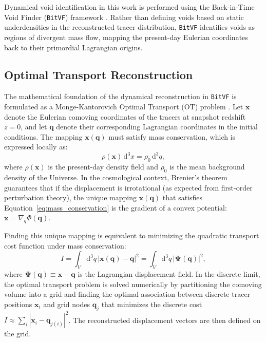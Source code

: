 \documentclass[12pt]{report}
\begin{document}
Dynamical void identification in this work is performed using the Back-in-Time Void Finder (\texttt{BitVF}) framework \citep{Sartori2025}. Rather than defining voids based on static underdensities in the reconstructed tracer distribution, \texttt{BitVF} identifies voids as regions of divergent mass flow, mapping the present-day Eulerian coordinates back to their primordial Lagrangian origins.

\subsection{Optimal Transport Reconstruction}

The mathematical foundation of the dynamical reconstruction in \texttt{BitVF} is formulated as a Monge-Kantorovich Optimal Transport (OT) problem \citep{Brenier2003}. Let $\mathbf{x}$ denote the Eulerian comoving coordinates of the tracers at snapshot redshift $z=0$, and let $\mathbf{q}$ denote their corresponding Lagrangian coordinates in the initial conditions. The mapping $\mathbf{x}(\mathbf{q})$ must satisfy mass conservation, which is expressed locally as:
\begin{equation}
    \rho(\mathbf{x})\,\mathrm{d}^3x = \rho_0\,\mathrm{d}^3q
    \label{eq:mass_conservation},
\end{equation}
where $\rho(\mathbf{x})$ is the present-day density field and $\rho_0$ is the mean background density of the Universe. In the cosmological context, Brenier's theorem \citep{Brenier1991} guarantees that if the displacement is irrotational (as expected from first-order perturbation theory), the unique mapping $\mathbf{x}(\mathbf{q})$ that satisfies Equation~\ref{eq:mass_conservation} is the gradient of a convex potential: $\mathbf{x} = \nabla_q \Phi(\mathbf{q})$. 

Finding this unique mapping is equivalent to minimizing the quadratic transport cost function under mass conservation:
\begin{equation}
    I = \int_{V} \mathrm{d}^3q \, |\mathbf{x}(\mathbf{q}) - \mathbf{q}|^2 = \int_{V} \mathrm{d}^3q \, |\boldsymbol{\Psi}(\mathbf{q})|^2
    \label{eq:ot_cost},
\end{equation}
where $\boldsymbol{\Psi}(\mathbf{q}) \equiv \mathbf{x} - \mathbf{q}$ is the Lagrangian displacement field. In the discrete limit, the optimal transport problem is solved numerically by partitioning the comoving volume into a grid and finding the optimal association between discrete tracer positions $\mathbf{x}_i$ and grid nodes $\mathbf{q}_j$ that minimizes the discrete cost $I \approx \sum_i |\mathbf{x}_i - \mathbf{q}_{j(i)}|^2$. The reconstructed displacement vectors are then defined on the grid.
\end{document}
